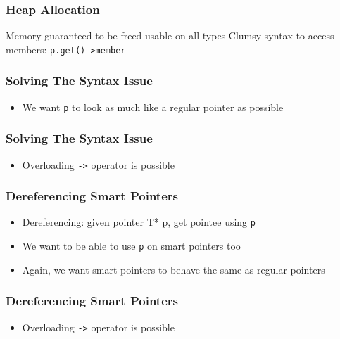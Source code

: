 \begin{frame}
  \frametitle{Heap Allocation}
  \begin{procontralist}
    \pro Memory guaranteed to be freed
     usable on all types
    \con Clumsy syntax to access members: {\tt p.get()->member}
  \end{procontralist}
\end{frame}

\begin{frame}
  \frametitle{Solving The Syntax Issue}
  \begin{itemize}
    \item We want {\tt p} to look as much like a regular pointer as possible
  \end{itemize}
\end{frame}

\begin{frame}
  \frametitle{Solving The Syntax Issue}
  \begin{itemize}
    \item Overloading {\tt ->} operator is possible
  \end{itemize}
\end{frame}

\begin{frame}
  \frametitle{Dereferencing Smart Pointers}
  \begin{itemize}
    \item Dereferencing: given pointer {T* p}, get pointee using {\tt *p}
    \item We want to be able to use {\tt *p} on smart pointers too
    \item Again, we want smart pointers to behave the same as regular pointers
  \end{itemize}
\end{frame}

\begin{frame}
  \frametitle{Dereferencing Smart Pointers}
  \begin{itemize}
    \item Overloading {\tt ->} operator is possible
  \end{itemize}
\end{frame}

